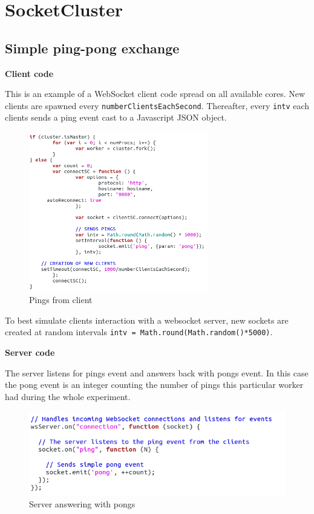 
\chapter{SocketCluster}
\label{SocketCluster}
\section{Simple ping-pong exchange}
\textbf{Client code}


This is an example of a WebSocket client code spread on all available cores.
New clients are spawned every \texttt{numberClientsEachSecond}. Thereafter,
every \texttt{intv} each clients sends a ping event cast to a Javascript JSON
object.

\begin{figure}[H]
	\centering
		\includegraphics[width=0.7\textwidth]{./Figures/WS_client_simplePing.png}
	\caption[Simple WebSocket client code]{Pings from client}
	\label{fig:WS_client_simplePing}
\end{figure}

To best simulate clients interaction with a websocket server, new sockets are
created at random intervals \texttt{intv = Math.round(Math.random()*5000)}.

\textbf{Server code}

The server listens for pings event and answers back with pongs event. In this
case the pong event is an integer counting the number of pings this particular
worker had during the whole experiment.

\begin{figure}[H]
	\centering
    \includegraphics[width=\textwidth]{./Figures/WS_server_simplePong.png}
	\caption[Simple WebSocket server code]{Server answering with pongs}
	\label{fig:WS_server_simplePong}
\end{figure}

